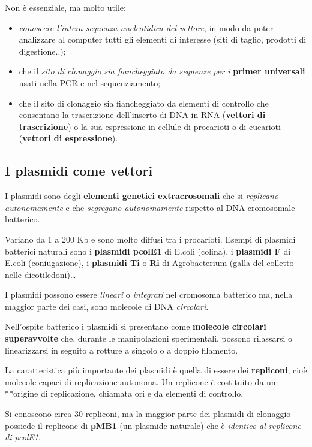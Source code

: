 \documentclass[11pt]{book}
\begin{document}
Non è essenziale, ma molto utile:

\begin{itemize}
\itemsep1pt\parskip0pt
\item
  \emph{conoscere l'intera sequenza nucleotidica del vettore}, in modo
  da poter analizzare al computer tutti gli elementi di interesse (siti
  di taglio, prodotti di digestione..);
\item
  che il \emph{sito di clonaggio sia fiancheggiato da sequenze per i}
  \textbf{primer universali} usati nella PCR e nel sequenziamento;
\item
  che il sito di clonaggio sia fiancheggiato da elementi di controllo
  che consentano la trascrizione dell'inserto di DNA in RNA
  (\textbf{vettori di trascrizione}) o la sua espressione in cellule di
  procarioti o di eucarioti (\textbf{vettori di espressione}).
\end{itemize}

\subsection{I plasmidi come vettori}\label{i-plasmidi-come-vettori}

I plasmidi sono degli \textbf{elementi genetici extracrosomali} che si
\emph{replicano autonomamente} e che \emph{segregano autonomamente}
rispetto al DNA cromosomale batterico.

Variano da 1 a 200 Kb e sono molto diffusi tra i procarioti. Esempi di
plasmidi batterici naturali sono i \textbf{plasmidi pcolE1} di E.coli
(colina), i \textbf{plasmidi F} di E.coli (coniugazione), i
\textbf{plasmidi Ti} o \textbf{Ri} di Agrobacterium (galla del colletto
nelle dicotiledoni)\ldots{}

I plasmidi possono essere \emph{lineari} o \emph{integrati} nel
cromosoma batterico ma, nella maggior parte dei casi, sono molecole di
DNA \emph{circolari}.

Nell'ospite batterico i plasmidi si presentano come \textbf{molecole
circolari superavvolte} che, durante le manipolazioni sperimentali,
possono rilassarsi o linearizzarsi in seguito a rotture a singolo o a
doppio filamento.

La caratteristica più importante dei plasmidi è quella di essere dei
\textbf{repliconi}, cioè molecole capaci di replicazione autonoma. Un
replicone è costituito da un **origine di replicazione, chiamata ori e
da elementi di controllo.

Si conoscono circa 30 repliconi, ma la maggior parte dei plasmidi di
clonaggio possiede il replicone di \textbf{pMB1} (un plasmide naturale)
che è \emph{identico al replicone di pcolE1}.
\end{document}
